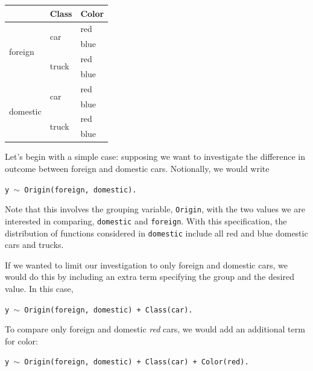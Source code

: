 \documentclass{article}
\newcommand{\xt}{\texttt}%
\begin{document}
\begin{center}

\begin{tabular}{|p{0.9in}|p{0.9in}|p{0.9in}|} \hline 
\rowcolor{lightgray} \multicolumn{1}{|c|}{Origin} & \multicolumn{1}{c|}{Class} & \multicolumn{1}{c|}{Color}\\
\hline
\multirow{4}{*}{foreign} & \multirow{2}{*}{car} & red \\
\hhline{~~-}
& & blue \\
\hhline{~--}
& \multirow{2}{*}{truck} & red \\
\hhline{~~-}
& & blue \\
\hline
\multirow{4}{*}{domestic} & \multirow{2}{*}{car} & red \\
\hhline{~~-}
& & blue \\
\hhline{~--}
& \multirow{2}{*}{truck} & red \\
\hhline{~~-}
& & blue \\
\hline
\end{tabular}
\end{center}

Let's begin with a simple case: supposing we want to investigate the difference in outcome between foreign and domestic cars. Notionally, we would write

\begin{center}
\tt y $\sim$ Origin(foreign, domestic).
\end{center}

Note that this involves the grouping variable, \xt{Origin}, with the two values we are interested in comparing, \xt{domestic} and \xt{foreign}. With this specification, the distribution of functions considered in \xt{domestic} include all red and blue domestic cars and trucks.


If we wanted to limit our investigation to only foreign and domestic cars, we would do this by including an extra term specifying the group and the desired value. In this case, 

\begin{center}
\tt y $\sim$ Origin(foreign, domestic) + Class(car).
\end{center}
To compare only foreign and domestic \textit{red} cars, we would add an additional term for color:

\begin{center}
\tt y $\sim$ Origin(foreign, domestic) + Class(car) + Color(red).
\end{center}
\end{document}
